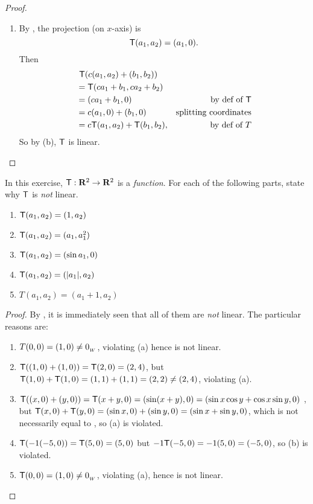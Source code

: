 \begin{proof}
\begin{enumerate}
\item
By , the projection (on \(x\)-axis) is
\[
    \textsf{T}(a_1, a_2) = (a_1, 0).
\]
Then
\begin{align*}
    & \ \textsf{T}(c(a_1, a_2) + (b_1, b_2)) \\
    & = \textsf{T}(ca_1 + b_1, ca_2 + b_2) \\
    & = (ca_1 + b_1, 0) & \text{by def of \(\textsf{T}\)} \\
    & = c(a_1, 0) + (b_1, 0) & \text{splitting coordinates} \\
    & = c\textsf{T}(a_1, a_2) + \textsf{T}(b_1, b_2), & \text{by def of \(T\)}
\end{align*}
So by (b), \(\textsf{T}\) is linear.
\end{enumerate}
\end{proof}

\begin{exercise} \label{exercise 2.1.9}
In this exercise, \(\textsf{T} : \mathbf{R}^2 \to \mathbf{R}^2\) is a \emph{function}.
For each of the following parts, state why \(\textsf{T}\) is \emph{not} linear.
\begin{enumerate}
\item \(\textsf{T}(a_1 , a_2) = (1, a_2)\)
\item \(\textsf{T}(a_1, a_2) = (a_1, a_1^2)\)
\item \(\textsf{T}(a_1, a_2) = (\sin a_1, 0)\)
\item \(\textsf{T}(a_1, a_2) = (\lvert a_1\rvert, a_2)\)
\item \(T(a_1, a_2) = (a_1 + 1, a_2)\)
\end{enumerate}
\end{exercise}

\begin{proof}
By , it is immediately seen that all of them are \emph{not} linear.
The particular reasons are:
\begin{enumerate}
\item \(T(0, 0) = (1, 0) \ne 0_{_W}\), violating (a) hence is not linear.
\item \(\textsf{T}((1, 0) + (1, 0)) = \textsf{T}(2, 0) = (2, 4)\), but \(\textsf{T}(1, 0) + \textsf{T}(1, 0) = (1, 1) + (1, 1) = (2, 2) \ne (2, 4)\), violating (a).
\item \(\textsf{T}((x, 0) + (y, 0)) = \textsf{T}(x + y, 0) = (\sin (x + y), 0) = (\sin x \cos y + \cos x \sin y, 0)\) ,
    but \(\textsf{T}(x, 0) + \textsf{T}(y, 0) = (\sin x, 0) + (\sin y, 0) = (\sin x + \sin y, 0)\),
    which is not necessarily equal to , so (a) is violated.
\item \(\textsf{T}(-1(-5, 0)) = \textsf{T}(5, 0) = (5, 0)\) but \(-1\textsf{T}(-5, 0) = -1(5, 0) = (-5, 0)\), so (b) is violated.
\item \(\textsf{T}(0, 0) = (1, 0) \ne 0_{_W}\), violating (a), hence is not linear.
\end{enumerate}
\end{proof}

